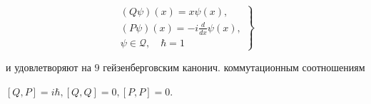 \documentclass[10pt]{article}
\begin{document}
\[

\left.\begin{array}{l}

(Q \psi)(x)=x \psi(x), \\

(P \psi)(x)=-i \frac{d}{d x} \psi(x), \\

\psi \in \mathscr{Q}, \quad \hbar=1

\end{array}\right\}

\]



и удовлетворяют на $\mathscr{9}$ гейзенберговским канонич. коммутационным соотношениям



$[Q, P]=i \hbar,[Q, Q]=0,[P, P]=0$.
\end{document}
